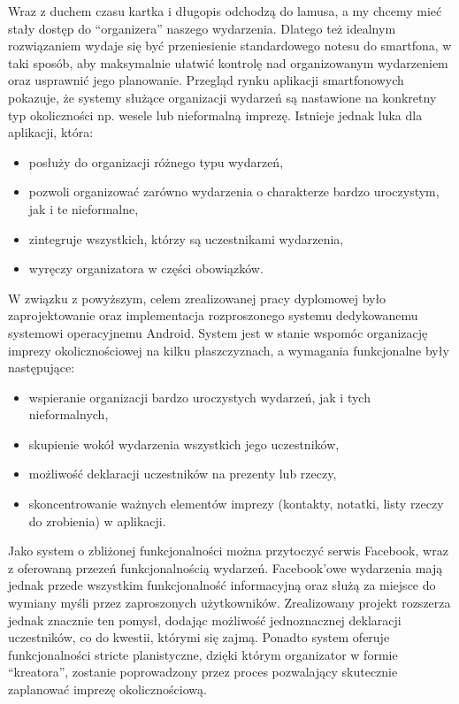 \documentclass[10pt,titlepage]{article}
\begin{document}
Wraz z duchem czasu kartka i długopis odchodzą do lamusa, a my chcemy mieć stały dostęp do ``organizera'' naszego wydarzenia. Dlatego też idealnym rozwiązaniem
wydaje się być przeniesienie standardowego notesu do smartfona, w taki sposób, aby maksymalnie ułatwić kontrolę nad organizowanym wydarzeniem oraz usprawnić jego planowanie.
Przegląd rynku aplikacji smartfonowych pokazuje, że systemy służące organizacji wydarzeń są nastawione na konkretny typ okoliczności np. wesele lub nieformalną imprezę.
Istnieje jednak luka dla aplikacji, która:

\begin{itemize}
 \item posłuży do organizacji różnego typu wydarzeń,
 \item pozwoli organizować zarówno wydarzenia o charakterze bardzo uroczystym, jak i te nieformalne,
 \item zintegruje wszystkich, którzy są uczestnikami wydarzenia,
 \item wyręczy organizatora w części obowiązków.
\end{itemize}


W związku z powyższym, celem zrealizowanej pracy dyplomowej było zaprojektowanie oraz implementacja rozproszonego systemu dedykowanemu systemowi operacyjnemu Android.
System jest w stanie wspomóc organizację imprezy okolicznościowej na kilku płaszczyznach, a wymagania funkcjonalne były następujące:

\begin{itemize}
 \item wspieranie organizacji bardzo uroczystych wydarzeń, jak i tych nieformalnych,
 \item skupienie wokół wydarzenia wszystkich jego uczestników,
 \item możliwość deklaracji uczestników na prezenty lub rzeczy,
 \item skoncentrowanie ważnych elementów imprezy (kontakty, notatki, listy rzeczy do zrobienia) w aplikacji.
\end{itemize}

Jako system o zbliżonej funkcjonalności można przytoczyć serwis Facebook, wraz z oferowaną przezeń funkcjonalnością wydarzeń.
Facebook'owe wydarzenia mają jednak przede wszystkim funkcjonalność informacyjną oraz służą za miejsce do wymiany myśli przez zaproszonych użytkowników.
Zrealizowany projekt rozszerza jednak znacznie ten pomysł, dodając możliwość jednoznacznej deklaracji uczestników, co do kwestii, którymi się zajmą.
Ponadto system oferuje funkcjonalności stricte planistyczne, dzięki którym organizator w formie ``kreatora'', zostanie poprowadzony przez proces pozwalający 
skutecznie zaplanować imprezę okolicznościową.
\end{document}
